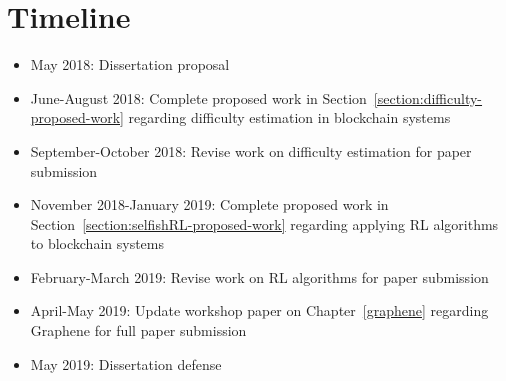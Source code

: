 \chapter{Timeline}
\label{timeline}

\begin{itemize}
\item May 2018: Dissertation proposal
\item June-August 2018: Complete proposed work in Section~\ref{section:difficulty-proposed-work} regarding difficulty estimation in blockchain systems
\item September-October 2018: Revise work on difficulty estimation for paper submission
\item November 2018-January 2019:  Complete proposed work in Section~\ref{section:selfishRL-proposed-work} regarding applying RL algorithms to blockchain systems
\item February-March 2019: Revise work on RL algorithms for paper submission
\item April-May 2019: Update workshop paper on Chapter~\ref{graphene} regarding Graphene for full paper submission
\item May 2019: Dissertation defense
\end{itemize}